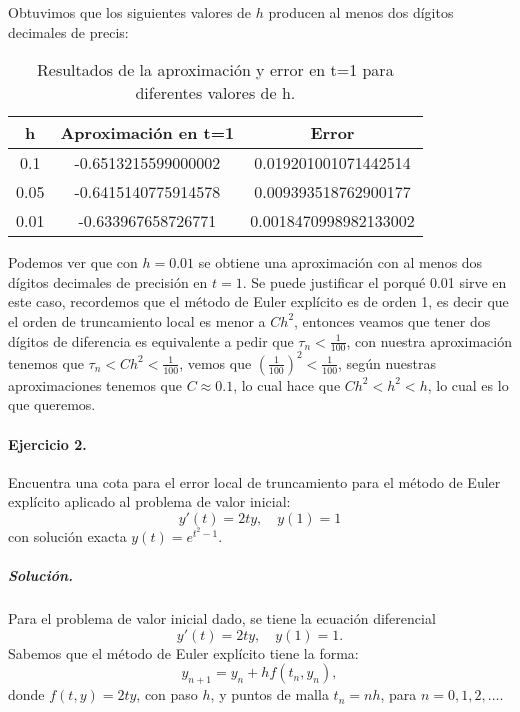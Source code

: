 \documentclass[12pt,letterpaper,oneside]{article}
\begin{document}
 Obtuvimos que los siguientes valores de \( h \) producen al menos dos dígitos decimales de precis:
 \begin{table}[h!]
    \centering
    \begin{tabular}{|c|c|c|}
    \hline
    \textbf{h} & \textbf{Aproximación en t=1} & \textbf{Error} \\ \hline
    0.1 & -0.6513215599000002 & 0.019201001071442514 \\ \hline
    0.05 & -0.6415140775914578 & 0.009393518762900177 \\ \hline
    0.01 & -0.633967658726771 & 0.0018470998982133002 \\ \hline
    \end{tabular}
    \caption{Resultados de la aproximación y error en t=1 para diferentes valores de h.}
    \end{table}

 Podemos ver que con \( h = 0.01 \) se obtiene una aproximación con al menos dos dígitos decimales de precisión en \( t = 1 \). Se puede justificar el porqué 0.01 sirve en este caso, recordemos que el método de Euler explícito es de orden 1, es decir que el orden de truncamiento local es menor a $Ch^2$, entonces veamos que tener dos dígitos de diferencia es equivalente a pedir que $\tau_n<\frac{1}{100}$, con nuestra aproximación tenemos que $\tau_n<Ch^2<\frac{1}{100}$, vemos que $\left(\frac{1}{100}\right)^2<\frac{1}{100}$, según nuestras aproximaciones tenemos que $C\approx0.1$, lo cual hace que $Ch^2<h^2<h$, lo cual es lo que queremos.


 \paragraph*{Ejercicio 2.} Encuentra una cota para el error local de truncamiento para el método de Euler explícito aplicado al problema de valor inicial:
 \[
 y'(t) = 2ty,\quad y(1) = 1
 \]
 con solución exacta \(y(t)=e^{t^2-1}\).
 
 \subparagraph*{Solución.} Para el problema de valor inicial dado, se tiene la ecuación diferencial 
 \[
 y'(t) = 2ty,\quad y(1) = 1.
 \]
 Sabemos que el método de Euler explícito tiene la forma:
 \[
 y_{n+1} = y_n + h f(t_n, y_n),
 \]
 donde \(f(t, y) = 2ty\), con paso \(h\), y puntos de malla \(t_n = nh\), para \(n = 0, 1, 2, \dots\).
 
\end{document}
